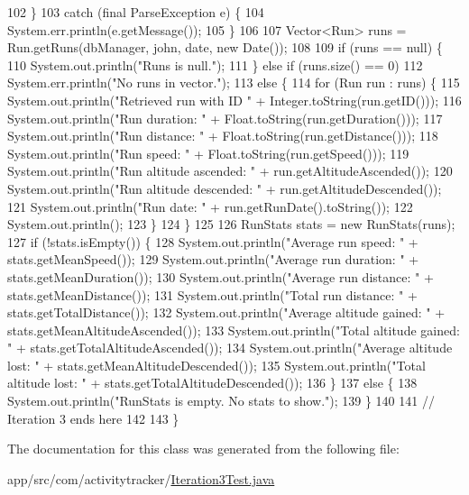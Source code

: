\begin{DoxyCode}
102         \}
103         \textcolor{keywordflow}{catch} (\textcolor{keyword}{final} ParseException e) \{
104             System.err.println(e.getMessage());
105         \}
106 
107         Vector<Run> runs = Run.getRuns(dbManager, john, date, \textcolor{keyword}{new} Date());
108 
109         \textcolor{keywordflow}{if} (runs == null) \{
110             System.out.println(\textcolor{stringliteral}{"Runs is null."});
111         \} \textcolor{keywordflow}{else} \textcolor{keywordflow}{if} (runs.size() == 0)
112             System.err.println(\textcolor{stringliteral}{"No runs in vector."});
113         \textcolor{keywordflow}{else} \{
114             \textcolor{keywordflow}{for} (Run run : runs) \{
115                 System.out.println(\textcolor{stringliteral}{"Retrieved run with ID "} + Integer.toString(run.getID()));
116                 System.out.println(\textcolor{stringliteral}{"Run duration: "} + Float.toString(run.getDuration()));
117                 System.out.println(\textcolor{stringliteral}{"Run distance: "} + Float.toString(run.getDistance()));
118                 System.out.println(\textcolor{stringliteral}{"Run speed: "} + Float.toString(run.getSpeed()));
119                 System.out.println(\textcolor{stringliteral}{"Run altitude ascended: "} + run.getAltitudeAscended());
120                 System.out.println(\textcolor{stringliteral}{"Run altitude descended: "} + run.getAltitudeDescended());
121                 System.out.println(\textcolor{stringliteral}{"Run date: "} + run.getRunDate().toString());
122                 System.out.println();
123             \}
124         \}
125 
126         RunStats stats = \textcolor{keyword}{new} RunStats(runs);
127         \textcolor{keywordflow}{if} (!stats.isEmpty()) \{
128             System.out.println(\textcolor{stringliteral}{"Average run speed: "} + stats.getMeanSpeed());
129             System.out.println(\textcolor{stringliteral}{"Average run duration: "} + stats.getMeanDuration());
130             System.out.println(\textcolor{stringliteral}{"Average run distance: "} + stats.getMeanDistance());
131             System.out.println(\textcolor{stringliteral}{"Total run distance: "} + stats.getTotalDistance());
132             System.out.println(\textcolor{stringliteral}{"Average altitude gained: "} + stats.getMeanAltitudeAscended());
133             System.out.println(\textcolor{stringliteral}{"Total altitude gained: "} + stats.getTotalAltitudeAscended());
134             System.out.println(\textcolor{stringliteral}{"Average altitude lost: "} + stats.getMeanAltitudeDescended());
135             System.out.println(\textcolor{stringliteral}{"Total altitude lost: "} + stats.getTotalAltitudeDescended());
136         \}
137         \textcolor{keywordflow}{else} \{
138             System.out.println(\textcolor{stringliteral}{"RunStats is empty. No stats to show."});
139         \}
140 
141         \textcolor{comment}{// Iteration 3 ends here}
142 
143     \}
\end{DoxyCode}


The documentation for this class was generated from the following file\+:\begin{DoxyCompactItemize}
\item 
app/src/com/activitytracker/\mbox{\hyperlink{_iteration3_test_8java}{Iteration3\+Test.\+java}}\end{DoxyCompactItemize}
